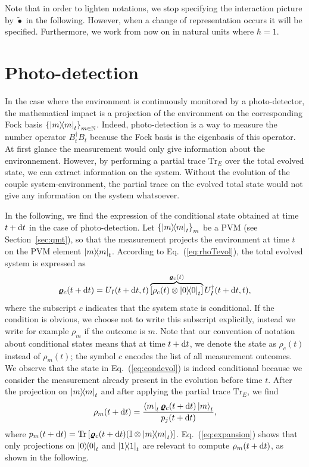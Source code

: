 Note that in order to lighten notations, we stop specifying the interaction picture by $\tilde{\bullet}$ in the following. However, when a change of representation occurs it will be specified. Furthermore, we work from now on in natural units where $\hbar=1$.

\section{Photo-detection}\label{sec:photodet}
In the case where the environment is continuously monitored by a photo-detector, the mathematical impact is a projection of the environment on the corresponding Fock basis $\qty{\ketbra{m}_t}_{m\in\mathbb{N}}$. Indeed, photo-detection is a way to measure the number operator $B_t^\dagger B_t$ because the Fock basis is the eigenbasis of this operator. At first glance the measurement would only give information about the environnement. However, by performing a partial trace $\mathrm{Tr}_E$ over the total evolved state, we can extract information on the system. Without the evolution of the couple system-environment, the partial trace on the evolved total state would not give any information on the system whatsoever.

In the following, we find the expression of the conditional state obtained at time $t+\mathrm{d}t$ in the case of photo-detection. Let $\qty{\ketbra{m}_t}_m$ be a PVM (see Section~\ref{sec:qmt}), so that the measurement projects the environment at time $t$ on the PVM element $\ketbra{m}_t$. According to Eq.~(\ref{eq:rhoTevol}), the total evolved system is expressed as
\begin{equation}\label{eq:condevol}
    \bm{\varrho}_c(t+\mathrm{d}t)= U_I(t+\mathrm{d}t,t)\overbrace{\qty[\rho_c(t)\otimes\ketbra{0}_t]}^{\bm{\varrho}_c(t)}U_I^\dagger(t+\mathrm{d}t,t),
\end{equation}
where the subscript $c$ indicates that the system state is conditional. If the condition is obvious, we choose not to write this subscript explicitly, instead we write for example $\rho_m$ if the outcome is $m$. Note that our convention of notation about conditional states means that at time $t+\mathrm{d}t$, we denote the state as $\rho_c(t)$ instead of $\rho_m(t)$; the symbol $c$ encodes the list of all measurement outcomes. We observe that the state in Eq.~(\ref{eq:condevol}) is indeed conditional because we consider the measurement already present in the evolution before time $t$. After the projection on $\ketbra{m}_t$ and after applying the partial trace $\mathrm{Tr}_E$, we find
\begin{equation}\label{eq:evolrho0}
    \rho_m(t+\mathrm{d}t)=\frac{\bra{m}_t\bm{\varrho}_c(t+\mathrm{d}t)\ket{m}_t}{p_j(t+\mathrm{d}t)},
\end{equation}
where $p_m(t+\mathrm{d}t)=\operatorname{Tr}\left[\bm{\varrho}_c(t+\mathrm{d}t)\qty(\mathbb{I}\otimes\ketbra{m}_t)\right]$. Eq.~(\ref{eq:expansion}) shows that only projections on $\ketbra{0}_t$ and $\ketbra{1}_t$ are relevant to compute $\rho_m(t+\mathrm{d}t)$, as shown in the following.
